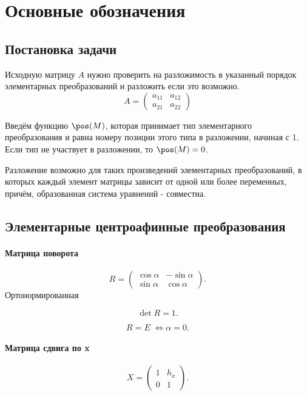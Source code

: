\section{Основные обозначения}

\subsection{Постановка задачи}

Исходную матрицу $A$ нужно проверить на разложимость в указанный порядок элементарных преобразований и разложить если это возможно.
$$A = 
\begin{pmatrix}
	a_{11} & a_{12}\\
	a_{21} & a_{22}
\end{pmatrix}
$$


Введём функцию $\pos(M)$, которая принимает тип элементарного преобразования и равна номеру позиции этого типа в разложении, начиная с 1. Если тип не участвует в разложении, то $\pos(M) = 0$.

Разложение возможно для таких произведений элементарных преобразований, в которых каждый элемент матрицы зависит от одной или более переменных, причём, образованная система уравнений - совместна.

\subsection{Элементарные центроафинные преобразования}

\paragraph{Матрица поворота}

$$R = \begin{pmatrix}
	\cos\alpha & -\sin\alpha \\
	\sin\alpha & \cos\alpha
\end{pmatrix}.
$$
Ортонормированная

$$\det R = 1.$$

$$R = E\; \Leftrightarrow \alpha = 0.$$


\paragraph{Матрица сдвига по x}
$$
X = \begin{pmatrix}
	1 & h_x \\
	0 & 1
\end{pmatrix}.
$$

